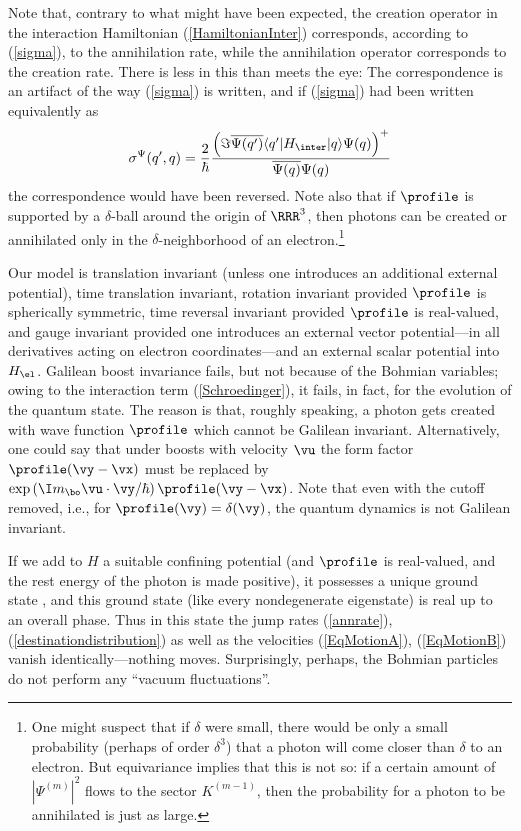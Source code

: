 \documentclass[12pt]{article}
\begin{document}
Note that, contrary to what might have been expected, the creation
operator in the interaction Hamiltonian (\ref{HamiltonianInter})
corresponds, according to (\ref{sigma}), to the annihilation rate,
while the annihilation operator corresponds to the creation
rate. There is less in this than meets the eye: The correspondence is
an artifact of the way (\ref{sigma}) is written, and if (\ref{sigma})
had been written equivalently as
\begin{equation}
  \sigma^{\Psi}(q',q)= {\frac2{\hbar}}\frac{\left(\Im
  \overline{\Psi(q')}\langle q'| H_{\inter} | q \rangle
  \Psi(q)\right)^+}{\overline{\Psi(q)}\Psi(q)} 
\end{equation}
the correspondence would have been reversed. Note 
also that if $\profile$ is supported by a $\delta$-ball around the origin
of $\RRR^3$, then photons can be created or annihilated only in the
$\delta$-neighborhood of an electron.\footnote {
%
One might suspect that if $\delta$ were small, there would be only a small
probability (perhaps of order $\delta^3$) that a photon will come closer
than $\delta$ to an electron. But equivariance implies that this is not so:
if a certain amount of $|\Psi^{(m)}|^2$ flows to the sector $K^{(m-1)}$,
then the probability for a photon to be annihilated  is just as large.
%
}

Our model is translation invariant (unless one introduces an
additional external potential), time translation invariant, rotation
invariant provided $\profile$ is spherically symmetric, time reversal
invariant provided $\profile$ is real-valued, and gauge invariant
provided one introduces an external vector potential---in all
derivatives acting on electron coordinates---and an external scalar
potential into $H_\el$. Galilean boost invariance fails, but not
because of the Bohmian variables; owing to the interaction term
(\ref{Schroedinger}), it fails, in fact, for the evolution of the
quantum state. The reason is that, roughly speaking, a photon gets
created with wave function $\profile$ which cannot be Galilean
invariant. Alternatively, one could say that under boosts with
velocity $\vu$ the form factor $\profile(\vy-\vx)$ must be replaced by
$\exp{(\I m_\bo \vu\cdot \vy/\hbar)}\, \profile(\vy-\vx)$. Note that
even with the cutoff removed, i.e., for $\profile(\vy)=\delta(\vy)$,
the quantum dynamics is not Galilean invariant.

If we add to $H$ a suitable confining potential (and $\profile$ is
real-valued, and the rest energy of the photon is made positive), it
possesses a unique ground state \cite{Spohn}, and this ground state (like
every nondegenerate eigenstate) is real up to an overall phase. Thus in
this state the jump rates (\ref{annrate}), (\ref{destinationdistribution})
as well as the velocities (\ref{EqMotionA}), (\ref{EqMotionB}) vanish
identically---nothing moves. Surprisingly, perhaps, the Bohmian particles
do not perform any ``vacuum fluctuations''.
\end{document}
